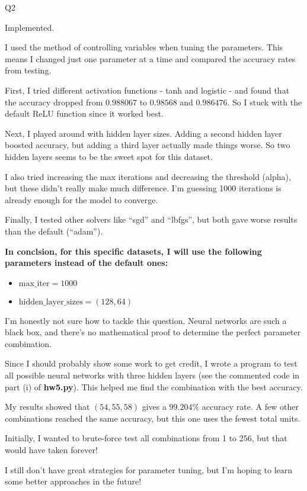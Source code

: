 \question Q2\droppoints

\begin{solution}
     Implemented.

    I used the method of controlling variables when tuning the parameters.
    This means I changed just one parameter at a time and compared the accuracy rates from testing.

    First, I tried different activation functions - tanh and logistic - and found that the accuracy dropped from $0.988067$ to $0.98568$ and $0.986476$.
    So I stuck with the default ReLU function since it worked best.

    Next, I played around with hidden layer sizes.
    Adding a second hidden layer boosted accuracy, but adding a third layer actually made things worse.
    So two hidden layers seems to be the sweet spot for this dataset.

    I also tried increasing the max iterations and decreasing the threshold (alpha), but these didn't really make much difference.
    I'm guessing 1000 iterations is already enough for the model to converge.

    Finally, I tested other solvers like ``sgd'' and ``lbfgs'', but both gave worse results than the default (``adam'').

    \textbf{In conclsion, for this specific datasets, I will use the following parameters instead of the default ones:}
    \begin{itemize}
        \item $\text{max\_iter}=1000$
        \item $\text{hidden\_layer\_sizes}=(128, 64)$
    \end{itemize}

    I'm honestly not sure how to tackle this question.
    Neural networks are such a black box, and there's no mathematical proof to determine the perfect parameter combination.

    Since I should probably show some work to get credit, I wrote a program to test all possible neural networks with three hidden layers (see the commented code in part (i) of \textbf{hw5.py}).
    This helped me find the combination with the best accuracy.

    My results showed that $(54, 55, 58)$ gives a $99.204\%$ accuracy rate.
    A few other combinations reached the same accuracy, but this one uses the fewest total units.

    Initially, I wanted to brute-force test all combinations from 1 to 256, but that would have taken forever!

    I still don't have great strategies for parameter tuning, but I'm hoping to learn some better approaches in the future!
\end{solution}
